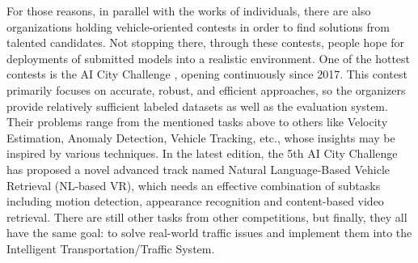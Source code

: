 For those reasons, in parallel with the works of individuals, there are also organizations holding vehicle-oriented contests in order to find solutions from talented candidates.
Not stopping there, through these contests, people hope for deployments of submitted models into a realistic environment. 
One of the hottest contests is the AI City Challenge \cite{Naphade17AIC17, Naphade18AIC18, Naphade19AIC19, Naphade20AIC20, Naphade21AIC21}, opening continuously since 2017.
This contest primarily focuses on accurate, robust, and efficient approaches, so the organizers provide relatively sufficient labeled datasets \cite{Feng21CityFlowNL, Tang19CityFlow, Yao20VehicleX} as well as the evaluation system.
Their problems range from the mentioned tasks above to others like Velocity Estimation, Anomaly Detection, Vehicle Tracking, etc., whose insights may be inspired by various techniques.
In the latest edition, the 5th AI City Challenge \cite{Naphade21AIC21} has proposed a novel advanced track named Natural Language-Based Vehicle Retrieval (NL-based VR), which needs an effective combination of subtasks including motion detection, appearance recognition and content-based video retrieval.
There are still other tasks from other competitions, but finally, they all have the same goal: to solve real-world traffic issues and implement them into the Intelligent Transportation/Traffic System.